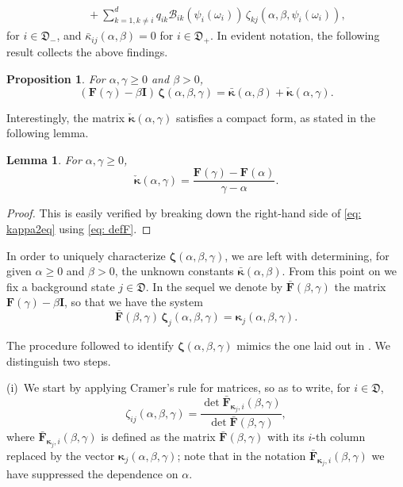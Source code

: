 \documentclass[reqno,12pt]{amsart}
\newcommand{\bs}{\boldsymbol}
\newcommand{\defD}{{\mathfrak D}}
\newcommand{\defDmin}{{\mathfrak D}_-}
\newcommand{\defDplus}{{\mathfrak D}_+}
\newtheorem{lemma}{Lemma}
\newtheorem{proposition}{Proposition}
\begin{document}
{\begin{align*}
    &\:\:\:\:\:+\sum_{k=1,k\neq i}^d q_{ik} \mathscr{B}_{ik}(\psi_i(\omega_i))\, \zeta_{kj}(\alpha,\beta,\psi_i(\omega_i)),
\end{align*}
for $i\in\defDmin $, and $\bar \kappa_{ij}(\alpha,\beta) = 0$ for $i\in\defDplus $.
In evident notation, the following result collects the above findings.
\begin{proposition}\label{prop: system zeta}
    For $\alpha,\gamma\geqslant 0$ and $\beta>0$, 
    \[ (\bs{F}(\gamma)-\beta\bs{I})\,{\bs \zeta}(\alpha,\beta,\gamma) = \bar{\bs \kappa}(\alpha,\beta)+\check{\bs \kappa}(\alpha,\gamma).\]
\end{proposition}
Interestingly, the matrix $ \check {\bs{\kappa}}(\alpha,\gamma)$ satisfies a compact form, as stated in the following lemma.
\begin{lemma}\label{lemma: kappa2}
    For $\alpha,\gamma\geqslant 0$,
    \begin{equation}\label{eq: kappa2eq}
        \check {\bs{\kappa}}(\alpha,\gamma) = \frac{\bs{F}(\gamma) - \bs{F}(\alpha)}{\gamma - \alpha}.
    \end{equation}
\end{lemma}
\begin{proof}
    This is easily verified by breaking down the right-hand side of \eqref{eq: kappa2eq} using \eqref{eq: defF}.
\end{proof}
In order to uniquely characterize ${\bs \zeta}(\alpha,\beta,\gamma)$, we are left with determining, for given $\alpha\geqslant0$ and $\beta>0$, the unknown constants $\bar {\bs{\kappa}}(\alpha,\beta)$. From this point on we fix a background state $j\in\defD $. In the sequel we denote by $\bar {\bs F}(\beta, \gamma)$ the matrix $\bs{F}(\gamma) - \beta\bs{I}$, so that we have the system
\[\bar{\bs F}(\beta,\gamma) \, \bs{\zeta}_j(\alpha,\beta,\gamma)= \bs{\kappa}_j(\alpha,\beta,\gamma).\]



The procedure followed to identify ${\bs \zeta}(\alpha,\beta,\gamma)$ mimics the one
laid out in \cite[\S 3.3]{MB}. We distinguish two steps. 

\medskip 

(i)~We start by applying Cramer's rule for matrices, so as to write, for $i\in\defD $,
\[\zeta_{ij}(\alpha,\beta,\gamma) = \frac{\det \bar {\bs F}_{\bs\kappa_j, i}(\beta, \gamma)}{\det\bar {\bs F}(\beta,\gamma)},\]
where $\bar {\bs F}_{\bs\kappa_j, i}(\beta, \gamma)$ is defined as the matrix $\bar {\bs F}(\beta,\gamma)$ with its $i$-th column replaced by the vector $\bs{\kappa}_j(\alpha, \beta, \gamma)$; note that in the notation $\bar {\bs F}_{\bs\kappa_j, i}(\beta, \gamma)$ we have suppressed the dependence on $\alpha$. 

}
\end{document}
